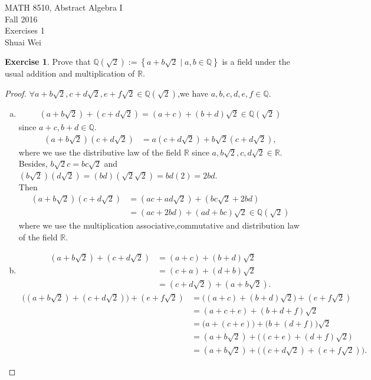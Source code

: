 \documentclass{amsart}
\newcommand{\bbr}{\mathbb{R}}
\newcommand{\bbq}{\mathbb{Q}}
\theoremstyle{plain}
\theoremstyle{definition}
\newtheorem{exer}[lem]{Exercise}
\begin{document}
\noindent MATH 8510, Abstract Algebra I \\
Fall 2016\\
Exercises 1\\
Shuai Wei
\

%
%

\begin{exer}
Prove that $\bbq(\sqrt 2):=\left\{a+b\sqrt 2\mid a,b\in\bbq\right\}$ is a field under the usual
addition and multiplication of $\bbr$.
\end{exer}
\begin{proof}
	$\forall a+b\sqrt 2, c+d\sqrt 2, e+f\sqrt 2\in \bbq(\sqrt 2)$,we have $a,b,c,d,e,f \in \bbq$.
		\begin{enumerate}[(a)]
			\item 
				\begin{align*}
					(a+b\sqrt 2) +( c+ d \sqrt 2) = (a+c) + (b+d)\sqrt 2 \in \bbq(\sqrt 2) 
				\end{align*}
				since $a+c, b+d \in \bbq$.
				\begin{align*}
					(a+b\sqrt 2)( c+ d \sqrt 2)&=a(c + d \sqrt 2) + b\sqrt 2(c+d\sqrt 2),
				\end{align*}
				where we use the distributive law of the field $\bbr$ since $a,b\sqrt 2, c,  d\sqrt 2 \in \bbr$. Besides, $b\sqrt 2 c = bc\sqrt 2$ and  $(b\sqrt 2)(d\sqrt 2) = (bd)(\sqrt 2\sqrt 2) = bd(2) = 2bd$.\\ 
				Then 
				\begin{align*}
					(a+b\sqrt 2)( c+ d \sqrt 2)  &= (ac +ad\sqrt 2) + (bc\sqrt 2 + 2bd) \\ & = (ac+2bd) + (ad+bc)\sqrt 2\in \bbq(\sqrt 2)
				\end{align*}
				where we use the multiplication associative,commutative and distribution law of the field $\bbr$. 
			\item 
				\begin{align*}
					(a+b\sqrt 2) +( c+ d \sqrt 2) &= (a+c) + (b+d)\sqrt 2 \\ &= (c+a) + (d+b)\sqrt 2 \\&= (c+d\sqrt 2) + (a+b\sqrt 2).
				\end{align*}
				\begin{align*}
					\Big((a+b\sqrt 2) + ( c+ d \sqrt 2)\Big) + (e+f\sqrt 2) &= \Big((a+c) + (b+d) \sqrt 2\Big) + (e+f \sqrt 2) \\&= (a+c+e)+(b+d+f) \sqrt 2 \\&= \Big(a+(c+e)\Big) + \Big(b+(d+f)\Big)\sqrt 2\\ &= (a+b\sqrt 2) +\Big((c+e)+(d+f)\sqrt 2\Big) \\&= (a +b\sqrt 2) + \Big((c+d\sqrt 2)+(e+f\sqrt 2)\Big).

\end{align*}
\end{enumerate}
\end{proof}
\end{document}
